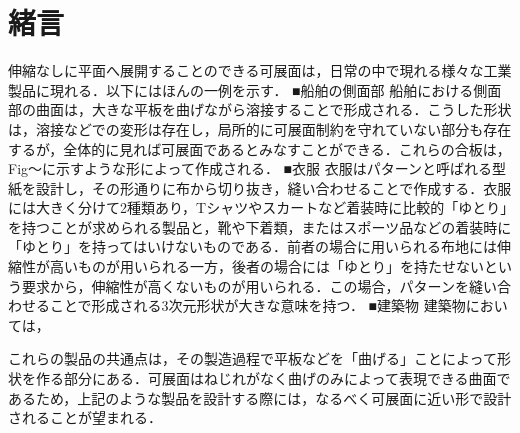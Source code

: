 \section{緒言}
伸縮なしに平面へ展開することのできる可展面は，日常の中で現れる様々な工業製品に現れる．以下にはほんの一例を示す．
■船舶の側面部
船舶における側面部の曲面は，大きな平板を曲げながら溶接することで形成される．こうした形状は，溶接などでの変形は存在し，局所的に可展面制約を守れていない部分も存在するが，全体的に見れば可展面であるとみなすことができる．これらの合板は，Fig～に示すような形によって作成される．
■衣服
衣服はパターンと呼ばれる型紙を設計し，その形通りに布から切り抜き，縫い合わせることで作成する．衣服には大きく分けて2種類あり，Tシャツやスカートなど着装時に比較的「ゆとり」を持つことが求められる製品と，靴や下着類，またはスポーツ品などの着装時に「ゆとり」を持ってはいけないものである．前者の場合に用いられる布地には伸縮性が高いものが用いられる一方，後者の場合には「ゆとり」を持たせないという要求から，伸縮性が高くないものが用いられる．この場合，パターンを縫い合わせることで形成される3次元形状が大きな意味を持つ．
■建築物
建築物においては，

これらの製品の共通点は，その製造過程で平板などを「曲げる」ことによって形状を作る部分にある．可展面はねじれがなく曲げのみによって表現できる曲面であるため，上記のような製品を設計する際には，なるべく可展面に近い形で設計されることが望まれる．